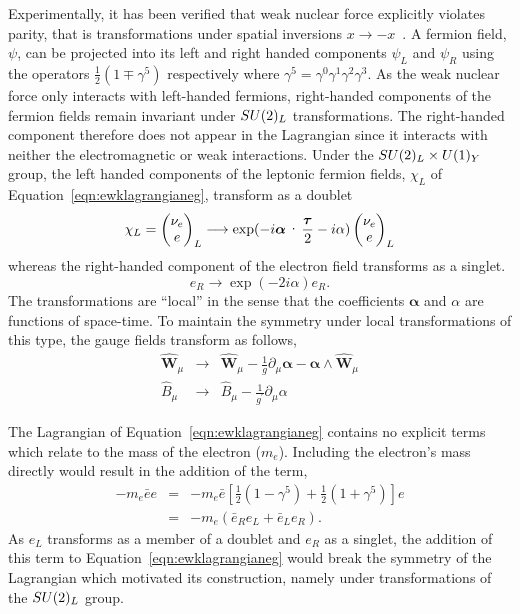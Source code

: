 Experimentally, it has been verified that weak nuclear force explicitly violates
parity, that is transformations under spatial inversions $x\rightarrow -x$~\citep{null}.
A fermion field, $\psi$, can be projected into its left and right handed components 
$\psi_{L}$ and $\psi_{R}$ using the operators $\frac{1}{2}(1\mp\gamma^{5})$ respectively 
where $\gamma^{5} = \gamma^{0}\gamma^{1}\gamma^{2}\gamma^{3}$.  
As the weak nuclear force only interacts with left-handed fermions, 
right-handed components of the fermion fields remain invariant under $SU(2)_{L}$ transformations.
The right-handed component therefore does not appear in the Lagrangian since it interacts with
neither the electromagnetic or weak interactions.
Under the $SU(2)_{L}\times U(1)_{Y}$ group, 
the left handed components of the leptonic fermion fields, 
$\chi_{L}$ of Equation~\ref{eqn:ewklagrangianeg}, transform as a doublet
\begin{equation}
\chi_{L}  =   
\everymath{\displaystyle} \begin{pmatrix}
\nu_{e} \\ 
e
\end{pmatrix}_{L}
 \longrightarrow 
\exp(-i\boldsymbol\alpha\cdot\frac{\boldsymbol\tau}{2} - i\alpha) 
\begin{pmatrix}
\nu_{e} \\ 
e
\end{pmatrix}_{L}
\end{equation}
\label{eqn:doublettrans}
whereas the right-handed component of the electron field transforms as a singlet.  
\begin{equation}
e_{R}
 \longrightarrow 
\exp(-2i{\alpha}) 
e_{R}.
\end{equation}
The transformations are ``local'' in the sense that the coefficients  
$\boldsymbol{\alpha}$ and $\alpha$ are functions of space-time. 
To maintain the symmetry under local transformations of this type, the gauge fields
transform as follows, 
\begin{eqnarray}
\hat{\mathbf{W}}_{\mu} & 
 \longrightarrow & 
\hat{\mathbf{W}}_{\mu} - \frac{1}{g}\partial_{\mu}\boldsymbol{\alpha} 
	- \boldsymbol{\alpha}\wedge\hat{\mathbf{W}}_{\mu} \\
\hat{{B}}_{\mu} & 
 \longrightarrow & 
\hat{{B}}_{\mu} - \frac{1}{g^{\prime}}\partial_{\mu}{\alpha} 
\end{eqnarray}

The Lagrangian of Equation~\ref{eqn:ewklagrangianeg} contains no explicit terms which 
relate to the mass of the electron ($m_{e}$). Including the electron's mass directly would 
result in the addition of the term,
\begin{eqnarray}
-m_{e}\bar{e}e  &=& -m_{e}\bar{e}\left[\frac{1}{2}\left(1-\gamma^{5}\right) 
		    + \frac{1}{2}\left(1+\gamma^{5}\right)\right]e \nonumber \\
		&=& -m_{e}\left(\bar{e}_{R}e_{L} + \bar{e}_{L}e_{R}\right).
\end{eqnarray}
As $e_{L}$ transforms as a member of a doublet and $e_{R}$ as a singlet, 
the addition of this term to Equation~\ref{eqn:ewklagrangianeg} 
would break the symmetry of the Lagrangian which motivated its construction, 
namely under transformations of the $SU(2)_{L}$ group.

